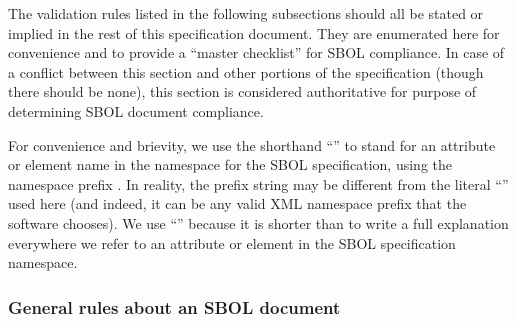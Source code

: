The validation rules listed in the following subsections should all be
stated or implied in the rest of this specification document.  They
are enumerated here for convenience and to provide a ``master
checklist'' for SBOL compliance.  In case of a conflict between this
section and other portions of the specification (though there should
be none), this section is considered authoritative for purpose of
determining SBOL document compliance.

For \notice convenience and brievity, we use the shorthand
``'' to stand for an attribute or element name 
in the namespace for the SBOL specification, using
the namespace prefix .  In reality, the prefix string may be different from the literal ``'' used here (and indeed, it can be any valid XML namespace prefix that the software
chooses).  We use ``'' because it is shorter than to
write a full explanation everywhere we refer to an attribute or element
in the SBOL specification namespace.

\subsubsection*{General rules about an SBOL document}
\setcounter{sbolCtr}{10101} 






